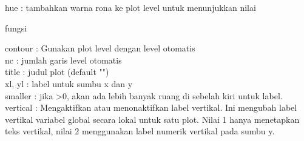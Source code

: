 \documentclass[a4paper,10pt]{article}
\begin{document}
\begin{eulernotebook}
\begin{eulercomment}
\begin{eulercomment}
\begin{eulercomment}
\begin{eulercomment}
\begin{eulercomment}
\begin{eulercomment}
\begin{eulercomment}
\begin{eulercomment}
\begin{eulercomment}
\begin{eulercomment}
\begin{eulercomment}
\begin{eulercomment}
\begin{eulercomment}
hue       : tambahkan warna rona ke plot level untuk menunjukkan nilai\\
\end{eulercomment}
\begin{eulerttcomment}
            fungsi
\end{eulerttcomment}
\begin{eulercomment}
contour   : Gunakan plot level dengan level otomatis\\
nc        : jumlah garis level otomatis\\
title     : judul plot (default "")\\
xl, yl    : label untuk sumbu x dan y\\
smaller   : jika \textgreater{}0, akan ada lebih banyak ruang di sebelah kiri untuk
label.\\
vertical  : Mengaktifkan atau menonaktifkan label vertikal. Ini
mengubah label vertikal variabel global secara lokal untuk satu plot.
Nilai 1 hanya menetapkan teks vertikal, nilai 2 menggunakan label
numerik vertikal pada sumbu y.


\end{eulercomment}
\end{eulercomment}
\end{eulercomment}
\end{eulercomment}
\end{eulercomment}
\end{eulercomment}
\end{eulercomment}
\end{eulercomment}
\end{eulercomment}
\end{eulercomment}
\end{eulercomment}
\end{eulercomment}
\end{eulercomment}
\end{eulernotebook}
\end{document}
